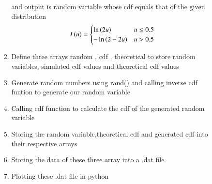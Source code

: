 \documentclass[journal,12pt,onecolumn]{IEEEtran}
\theoremstyle{remark}
\begin{document}
\begin{enumerate}
\begin{enumerate}
\begin{enumerate}
	and output is random variable whose cdf equals that of the given distribution
	\begin{align}
  I\left(u\right) &=
  \begin{cases}
	  \ln\left(2u\right) & u \le 0.5
  \\
	  -\ln \left(2-2u\right) &  u > 0.5
  \end{cases}
  \end{align}
\item Define three arrays random , cdf
	, theoretical
	to store random variables, simulated cdf values and theoretical cdf values
\item Generate random numbers using rand() and calling inverse cdf funtion to generate our random variable
\item Calling cdf function to calculate the cdf of the generated random variable
\item Storing the random variable,theoretical cdf and generated cdf into their respective arrays
\item Storing the data of these three array into a .dat file
\item Plotting these .dat file in python
\end{enumerate}
\end{enumerate}
\end{enumerate}
\end{document}

